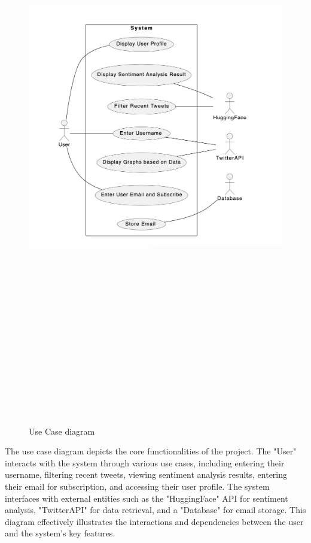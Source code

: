 \documentclass[a4paper,12pt]{article}
\begin{document}
{{{		\begin{figure}[htbp]
			\centering
			\includegraphics[width=6in, height=10in, keepaspectratio]{usecase.png}
			\label{usecase_diagram}
			\caption{Use Case diagram}
		\end{figure}
								
				
	The use case diagram depicts the core functionalities of the project. The "User" interacts with the system through various use cases, including entering their username, filtering recent tweets, viewing sentiment analysis results, entering their email for subscription, and accessing their user profile. The system interfaces with external entities such as the "HuggingFace" API for sentiment analysis, "TwitterAPI" for data retrieval, and a "Database" for email storage. This diagram effectively illustrates the interactions and dependencies between the user and the system's key features.

}}}
\end{document}
